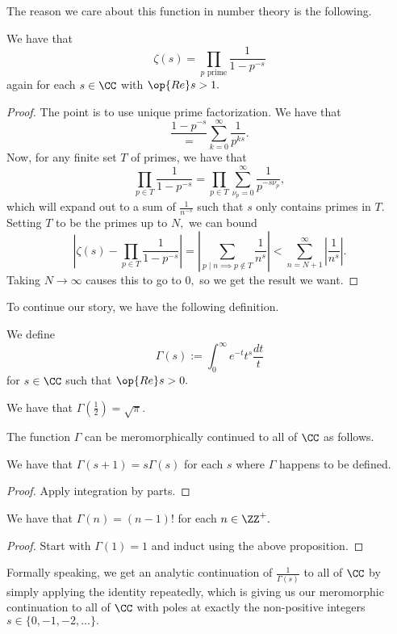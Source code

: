 The reason we care about this function in number theory is the following.
\begin{proposition}
	We have that
	\[\zeta(s)=\prod_{p\text{ prime}}\frac1{1-p^{-s}}\]
	again for each $s\in\CC$ with $\op{Re}s>1.$
\end{proposition}
\begin{proof}
	The point is to use unique prime factorization. We have that
	\[\frac{1-p^{-s}}=\sum_{k=0}^\infty\frac1{p^{ks}}.\]
	Now, for any finite set $T$ of primes, we have that
	\[\prod_{p\in T}\frac1{1-p^{-s}}=\prod_{p\in T}\sum_{\nu_p=0}^\infty\frac1{p^{-s\nu_p}},\]
	which will expand out to a sum of $\frac1{n^{-s}}$ such that $s$ only contains primes in $T.$ Setting $T$ to be the primes up to $N,$ we can bound
	\[\left|\zeta(s)-\prod_{p\in T}\frac1{1-p^{-s}}\right|=\left|\sum_{p\mid n\implies p\notin T}\frac1{n^s}\right|<\sum_{n=N+1}^\infty\left|\frac1{n^s}\right|.\]
	Taking $N\to\infty$ causes this to go to $0,$ so we get the result we want.
\end{proof}
To continue our story, we have the following definition.
\begin{definition}
	We define
	\[\Gamma(s):=\int_0^\infty e^{-t}t^s\frac{dt}t\]
	for $s\in\CC$ such that $\op{Re}s>0.$
\end{definition}
\begin{example}
	We have that $\Gamma\left(\frac12\right)=\sqrt\pi.$
\end{example}
The function $\Gamma$ can be meromorphically continued to all of $\CC$ as follows.
\begin{proposition}
	We have that $\Gamma(s+1)=s\Gamma(s)$ for each $s$ where $\Gamma$ happens to be defined.
\end{proposition}
\begin{proof}
	Apply integration by parts.
\end{proof}
\begin{corollary}
	We have that $\Gamma(n)=(n-1)!$ for each $n\in\ZZ^+.$
\end{corollary}
\begin{proof}
	Start with $\Gamma(1)=1$ and induct using the above proposition.
\end{proof}
Formally speaking, we get an analytic continuation of $\frac1{\Gamma(s)}$ to all of $\CC$ by simply applying the identity repeatedly, which is giving us our meromorphic continuation to all of $\CC$ with poles at exactly the non-positive integers $s\in\{0,-1,-2,\ldots\}.$